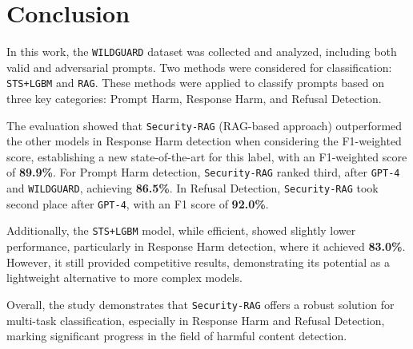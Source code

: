 \documentclass{article}
\begin{document}
\section{Conclusion}

In this work, the \texttt{WILDGUARD} dataset was collected and analyzed, including both valid and adversarial prompts. Two methods were considered for classification: \texttt{STS+LGBM} and \texttt{RAG}. These methods were applied to classify prompts based on three key categories: Prompt Harm, Response Harm, and Refusal Detection.

The evaluation showed that \texttt{Security-RAG} (RAG-based approach) outperformed the other models in Response Harm detection when considering the F1-weighted score, establishing a new state-of-the-art for this label, with an F1-weighted score of \textbf{89.9\%}. For Prompt Harm detection, \texttt{Security-RAG} ranked third, after \texttt{GPT-4} and \texttt{WILDGUARD}, achieving \textbf{86.5\%}. In Refusal Detection, \texttt{Security-RAG} took second place after \texttt{GPT-4}, with an F1 score of \textbf{92.0\%}.

Additionally, the \texttt{STS+LGBM} model, while efficient, showed slightly lower performance, particularly in Response Harm detection, where it achieved \textbf{83.0\%}. However, it still provided competitive results, demonstrating its potential as a lightweight alternative to more complex models.

Overall, the study demonstrates that \texttt{Security-RAG} offers a robust solution for multi-task classification, especially in Response Harm and Refusal Detection, marking significant progress in the field of harmful content detection.






\end{document}
